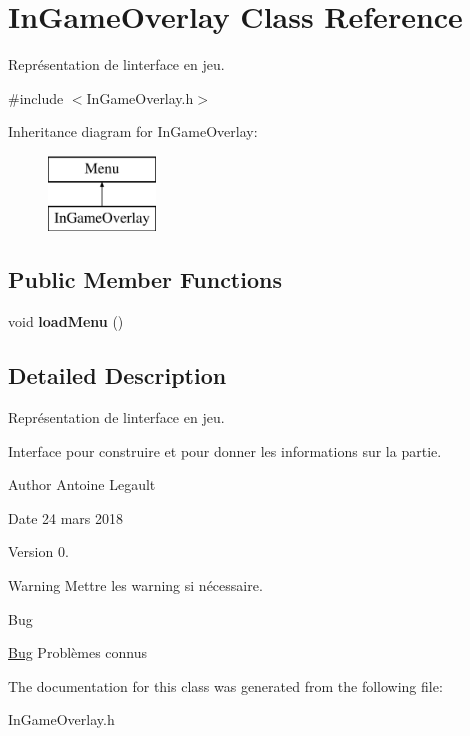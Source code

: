 \hypertarget{class_in_game_overlay}{}\section{In\+Game\+Overlay Class Reference}
\label{class_in_game_overlay}


Représentation de l\textquotesingle{}interface en jeu.  




{\ttfamily \#include $<$In\+Game\+Overlay.\+h$>$}

Inheritance diagram for In\+Game\+Overlay\+:\begin{figure}[H]
\begin{center}
\leavevmode
\includegraphics[height=2.000000cm]{class_in_game_overlay}
\end{center}
\end{figure}
\subsection*{Public Member Functions}
\begin{DoxyCompactItemize}
\item 
\hypertarget{class_in_game_overlay_a3894c2ee097b8e9c1945296096d4f459}{}void {\bfseries load\+Menu} ()\label{class_in_game_overlay_a3894c2ee097b8e9c1945296096d4f459}

\end{DoxyCompactItemize}


\subsection{Detailed Description}
Représentation de l\textquotesingle{}interface en jeu. 

Interface pour construire et pour donner les informations sur la partie. \begin{DoxyAuthor}{Author}
Antoine Legault 
\end{DoxyAuthor}
\begin{DoxyDate}{Date}
24 mars 2018 
\end{DoxyDate}
\begin{DoxyVersion}{Version}
0. 
\end{DoxyVersion}
\begin{DoxyWarning}{Warning}
Mettre les warning si nécessaire. 
\end{DoxyWarning}
\begin{DoxyRefDesc}{Bug}
\item[\hyperlink{bug__bug000005}{Bug}]Problèmes connus \end{DoxyRefDesc}


The documentation for this class was generated from the following file\+:\begin{DoxyCompactItemize}
\item 
In\+Game\+Overlay.\+h\end{DoxyCompactItemize}
